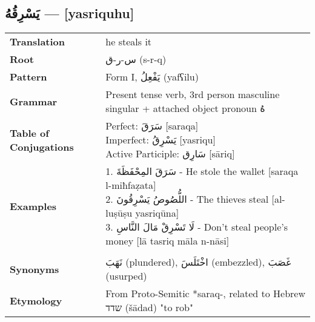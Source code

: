 \documentclass[letterpaper,12pt]{article}
\begin{document}
\subsection{\textarabic{يَسْرِقُهُ} — [yasriquhu]}
\begin{tabular}{p{3cm}p{10cm}}
\toprule

\textbf{Translation} & he steals it \\
\textbf{Root} & \textarabic{س-ر-ق} (s-r-q) \\
\textbf{Pattern} & Form I, \textarabic{يَفْعِلُ} (yafʕilu) \\
\textbf{Grammar} & Present tense verb, 3rd person masculine singular + attached object pronoun \textarabic{هُ} \\
\textbf{Table of Conjugations} & \makecell[l]{
Perfect: \textarabic{سَرَقَ} [saraqa]\\
Imperfect: \textarabic{يَسْرِقُ} [yasriqu]\\
Active Participle: \textarabic{سَارِق} [sāriq]
} \\
\textbf{Examples} & \makecell[l]{\parbox{9.5cm}{
1. \textarabic{سَرَقَ المِحْفَظَةَ} - He stole the wallet [saraqa l-miħfaẓata]\\
2. \textarabic{اللُّصُوصُ يَسْرِقُونَ} - The thieves steal [al-luṣūṣu yasriqūna]\\
3. \textarabic{لَا تَسْرِقْ مَالَ النَّاسِ} - Don't steal people's money [lā tasriq māla n-nāsi]
}} \\
\midrule \\
\textbf{Synonyms} & \textarabic{نَهَبَ} (plundered), \textarabic{اخْتَلَسَ} (embezzled), \textarabic{غَصَبَ} (usurped) \\
\textbf{Etymology} & From Proto-Semitic *saraq-, related to Hebrew \texthebrew{שדד} (šādad) "to rob" \\
\bottomrule
\end{tabular}
\end{document}
